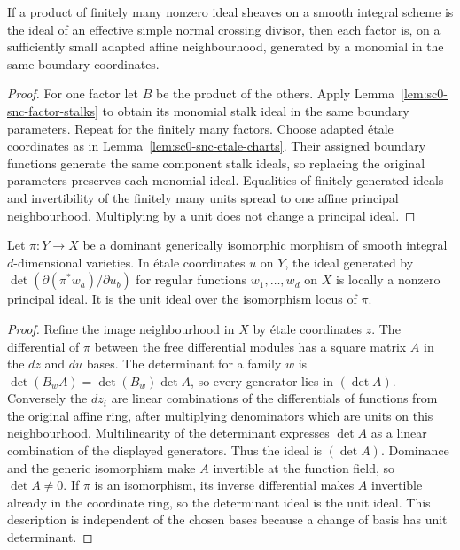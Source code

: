 \begin{lemma}\label{lem:sc0-snc-factors}
\notready
{}
If a product of finitely many nonzero ideal sheaves on a smooth integral scheme is the ideal of
an effective simple normal crossing divisor, then each factor is, on a sufficiently small adapted
affine neighbourhood, generated by a monomial in the same boundary coordinates.
\end{lemma}
\begin{proof}
For one factor let $B$ be the product of the others. Apply
Lemma~\ref{lem:sc0-snc-factor-stalks} to obtain its monomial stalk ideal in the same boundary
parameters. Repeat for the finitely many factors. Choose adapted \'etale coordinates as in
Lemma~\ref{lem:sc0-snc-etale-charts}. Their assigned boundary functions generate the same
component stalk ideals, so replacing the original parameters preserves each monomial ideal.
Equalities of finitely
generated ideals and invertibility of the finitely many units spread to one affine principal
neighbourhood. Multiplying by a unit does not change a principal ideal.
\end{proof}

\begin{lemma}\label{lem:sc0-jacobian-line}
\notready
Let $\pi\colon Y\to X$ be a dominant generically isomorphic morphism of smooth integral
$d$-dimensional varieties. In \'etale coordinates $u$ on $Y$, the ideal generated by
$\det(\partial(\pi^*w_a)/\partial u_b)$ for regular functions $w_1,\ldots,w_d$ on $X$ is
locally a nonzero principal ideal. It is the unit ideal over the isomorphism locus of $\pi$.
\end{lemma}
\begin{proof}
Refine the image neighbourhood in $X$ by \'etale coordinates $z$. The differential of $\pi$
between the free differential modules has a square matrix $A$ in the $dz$ and $du$ bases.
The determinant for a family $w$ is $\det(B_wA)=\det(B_w)\det A$, so every generator lies in
$(\det A)$. Conversely the $dz_i$ are linear combinations of the differentials of functions
from the original affine ring, after multiplying denominators which are units on this
neighbourhood. Multilinearity of the determinant expresses $\det A$ as a linear combination
of the displayed generators. Thus the ideal is $(\det A)$. Dominance and the generic isomorphism
make $A$ invertible at the function field, so $\det A\ne0$. If $\pi$ is an isomorphism, its inverse
differential makes $A$ invertible already in the coordinate ring, so the determinant ideal is the
unit ideal. This description is independent of the chosen bases because a change of basis has
unit determinant.
\end{proof}

